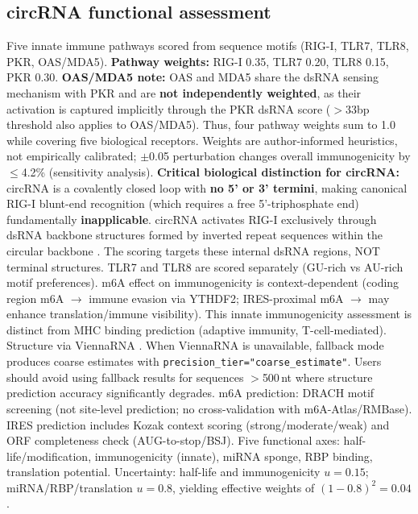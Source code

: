 \subsection*{circRNA functional assessment}
Five innate immune pathways scored from sequence motifs (RIG-I, TLR7, TLR8, PKR, OAS/MDA5). \textbf{Pathway weights:} RIG-I 0.35, TLR7 0.20, TLR8 0.15, PKR 0.30. \textbf{OAS/MDA5 note:} OAS and MDA5 share the dsRNA sensing mechanism with PKR and are \textbf{not independently weighted}, as their activation is captured implicitly through the PKR dsRNA score ($>$33bp threshold also applies to OAS/MDA5). Thus, four pathway weights sum to 1.0 while covering five biological receptors. Weights are author-informed heuristics, not empirically calibrated; $\pm$0.05 perturbation changes overall immunogenicity by $\leq$4.2\% (sensitivity analysis). \textbf{Critical biological distinction for circRNA:} circRNA is a covalently closed loop with \textbf{no 5' or 3' termini}, making canonical RIG-I blunt-end recognition (which requires a free 5'-triphosphate end) fundamentally \textbf{inapplicable}. circRNA activates RIG-I exclusively through dsRNA backbone structures formed by inverted repeat sequences within the circular backbone \citep{zhang2016}. The scoring targets these internal dsRNA regions, NOT terminal structures. TLR7 and TLR8 are scored separately (GU-rich vs AU-rich motif preferences). m6A effect on immunogenicity is context-dependent (coding region m6A $\to$ immune evasion via YTHDF2; IRES-proximal m6A $\to$ may enhance translation/immune visibility). This innate immunogenicity assessment is distinct from MHC binding prediction (adaptive immunity, T-cell-mediated). Structure via ViennaRNA \citep{lorenz2011}. When ViennaRNA is unavailable, fallback mode produces coarse estimates with \texttt{precision\_tier="coarse\_estimate"}. Users should avoid using fallback results for sequences $>$500\,nt where structure prediction accuracy significantly degrades. m6A prediction: DRACH motif screening (not site-level prediction; no cross-validation with m6A-Atlas/RMBase). IRES prediction includes Kozak context scoring (strong/moderate/weak) and ORF completeness check (AUG-to-stop/BSJ). Five functional axes: half-life/modification, immunogenicity (innate), miRNA sponge, RBP binding, translation potential. Uncertainty: half-life and immunogenicity $u{=}0.15$; miRNA/RBP/translation $u{=}0.8$, yielding effective weights of $(1{-}0.8)^2{=}0.04$.

